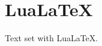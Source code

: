 \documentclass{article}
\begin{document}
\section{LuaLaTeX}
Text set with LuaLaTeX.


\end{document}
